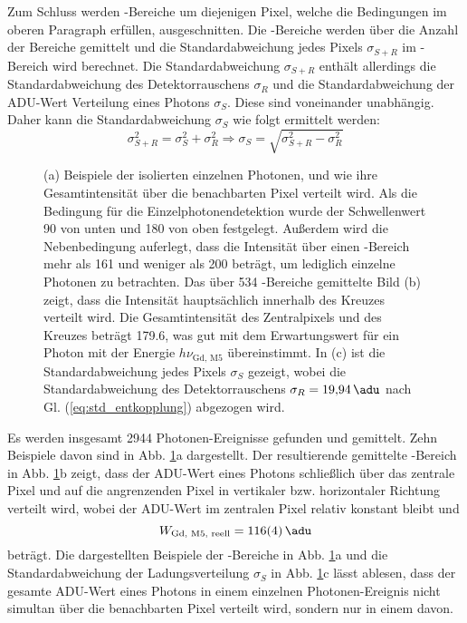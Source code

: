 \noindent
Zum Schluss werden -Bereiche um diejenigen Pixel, welche die Bedingungen im oberen Paragraph erfüllen, ausgeschnitten. Die -Bereiche werden über die Anzahl der Bereiche gemittelt und die Standardabweichung jedes Pixels $\sigma_{S+R}$ im -Bereich wird berechnet. Die Standardabweichung $\sigma_{S+R}$ enthält allerdings die Standardabweichung des Detektorrauschens $\sigma_{R}$ und die Standardabweichung der ADU-Wert Verteilung eines Photons $\sigma_{S}$. Diese sind voneinander unabhängig. Daher kann die Standardabweichung $\sigma_{S}$ wie folgt ermittelt werden:
\begin{equation}
    \sigma_{S+R}^2 = \sigma_{S}^2 + \sigma_{R}^2 \Rightarrow \sigma_{S} = \sqrt{\sigma_{S+R}^2 - \sigma_{R}^2}
    \label{eq:std_entkopplung}
\end{equation}
\begin{figure}[H]
    \centering
    
    \caption{(a) Beispiele der isolierten einzelnen Photonen, und wie ihre Gesamtintensität über die benachbarten Pixel verteilt wird. Als die Bedingung für die Einzelphotonendetektion wurde der Schwellenwert \SI{90}{\adu} von unten und \SI{180}{\adu} von oben festgelegt. Außerdem wird die Nebenbedingung auferlegt, dass die Intensität über einen -Bereich mehr als \SI{161}{\adu} und weniger als \SI{200}{\adu} beträgt, um lediglich einzelne Photonen zu betrachten. Das über 534 -Bereiche gemittelte Bild (b) zeigt, dass die Intensität hauptsächlich innerhalb des Kreuzes verteilt wird. Die Gesamtintensität des Zentralpixels und des Kreuzes beträgt \SI{179.6}{\adu}, was gut mit dem Erwartungswert für ein Photon mit der Energie $h\nu_\text{Gd, M5}$ übereinstimmt. In (c) ist die Standardabweichung jedes Pixels $\sigma_{S}$ gezeigt, wobei die Standardabweichung des Detektorrauschens $\sigma_R = \SI{19.94}{\adu}$ nach Gl. (\ref{eq:std_entkopplung}) abgezogen wird.}
    \label{fig:examples_average_std_5x5_hotspot}
\end{figure}
\noindent
Es werden insgesamt 2944 Photonen-Ereignisse gefunden und gemittelt. Zehn Beispiele davon sind in Abb. \ref{fig:examples_average_std_5x5_hotspot}a dargestellt. Der resultierende gemittelte -Bereich in Abb. \ref{fig:examples_average_std_5x5_hotspot}b zeigt, dass der ADU-Wert eines Photons schließlich über das zentrale Pixel und auf die angrenzenden Pixel in vertikaler bzw. horizontaler Richtung verteilt wird, wobei der ADU-Wert im zentralen Pixel relativ konstant bleibt und 
\begin{equation}
    W_\text{Gd, M5, reell}  = \SI{116(4)}{\adu} 
\end{equation}
beträgt. Die dargestellten Beispiele der -Bereiche in Abb. \ref{fig:examples_average_std_5x5_hotspot}a und die Standardabweichung der Ladungsverteilung $\sigma_{S}$ in Abb. \ref{fig:examples_average_std_5x5_hotspot}c lässt ablesen, dass der gesamte ADU-Wert eines Photons in einem einzelnen Photonen-Ereignis nicht simultan über die benachbarten Pixel verteilt wird, sondern nur in einem davon. 

